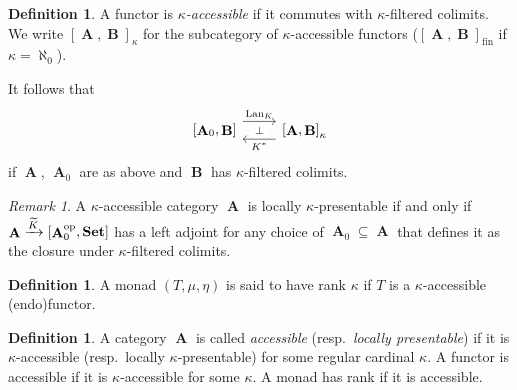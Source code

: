 \documentclass[a4paper,11pt,fullpage,oneside,openany]{amsbook}
\newcommand{\catname}[1]{{\normalfont\textbf{#1}}}
\newcommand{\Set}{\catname{Set}}
\DeclareMathOperator{\op}{\text{op}}
\DeclareMathOperator{\A}{\mathbf{A}}
\DeclareMathOperator{\B}{\mathbf{B}}
\DeclareMathOperator{\Lan}{Lan}
\theoremstyle{definition}
\theoremstyle{definition}
\newtheorem{defn}[thm]{Definition} %
\theoremstyle{remark}
\newtheorem{rmk}[thm]{Remark}
\begin{document}
\begin{defn}
A functor is \emph{$\kappa$-accessible} if it commutes with $\kappa$-filtered colimits. We write $\left[\A,\B\right]_\kappa$ for the subcategory of $\kappa$-accessible functors ($\left[\A,\B\right]_{\text{fin}}$ if $\kappa=\aleph_0$).
\end{defn}
It follows that 
 \[
\begin{tikzcd}
\left[\A_0,\B\right]\ar[r, shift left=1.5ex,"\Lan_K",""{name=A, below}] & \left[\A,\B\right]_\kappa\ar[l, shift left=1.5ex, "K^*",""{name=B,above}] \ar[from=A, to=B, "\perp"description]
\end{tikzcd}
      \]
if $\A$, $\A_0$ are as above and $\B$ has $\kappa$-filtered colimits.
\begin{rmk}
    A $\kappa$-accessible category $\A$ is locally $\kappa$-presentable if and only if $\A\xrightarrow{\widetilde{K}}\left[\A_0^{\op},\Set\right]$ has a left adjoint for any choice of $\A_0\subseteq\A$ that defines it as the closure under $\kappa$-filtered colimits.
\end{rmk}
\begin{defn}
A monad $(T,\mu,\eta)$ is said to have rank $\kappa$ if $T$ is a $\kappa$-accessible (endo)functor.
\end{defn}
\begin{defn}
A category $\A$ is called \emph{accessible} (resp.\ \emph{locally presentable}) if it is $\kappa$-accessible (resp.\ locally $\kappa$-presentable) for some regular cardinal $\kappa$. A functor is accessible if it is $\kappa$-accessible for some $\kappa$. A monad has rank if it is accessible.
\end{defn}
\end{document}
